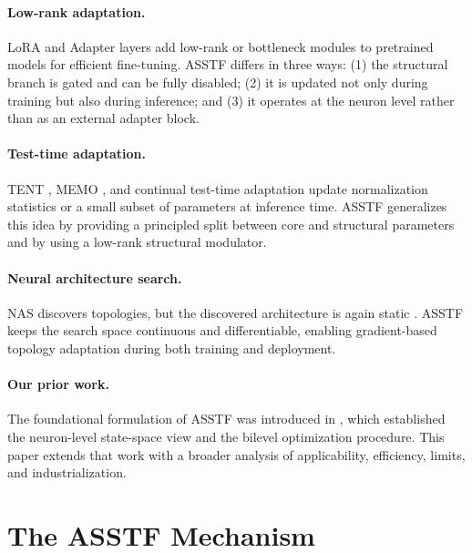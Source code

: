 \documentclass[11pt,a4paper]{article}
\theoremstyle{definition}
\begin{document}
\paragraph{Low-rank adaptation.} LoRA \cite{hu2021lora} and Adapter layers \cite{houlsby2019parameter} add low-rank or bottleneck modules to pretrained models for efficient fine-tuning. ASSTF differs in three ways: (1) the structural branch is gated and can be fully disabled; (2) it is updated not only during training but also during inference; and (3) it operates at the neuron level rather than as an external adapter block.

\paragraph{Test-time adaptation.} TENT \cite{wang2020tent}, MEMO \cite{zhang2022memo}, and continual test-time adaptation \cite{wang2021continual} update normalization statistics or a small subset of parameters at inference time. ASSTF generalizes this idea by providing a principled split between core and structural parameters and by using a low-rank structural modulator.

\paragraph{Neural architecture search.} NAS discovers topologies, but the discovered architecture is again static \cite{elsken2019neural}. ASSTF keeps the search space continuous and differentiable, enabling gradient-based topology adaptation during both training and deployment.

\paragraph{Our prior work.} The foundational formulation of ASSTF was introduced in \cite{lin2025asstf}, which established the neuron-level state-space view and the bilevel optimization procedure. This paper extends that work with a broader analysis of applicability, efficiency, limits, and industrialization.

\section{The ASSTF Mechanism}
\label{sec:mechanism}

\end{document}
